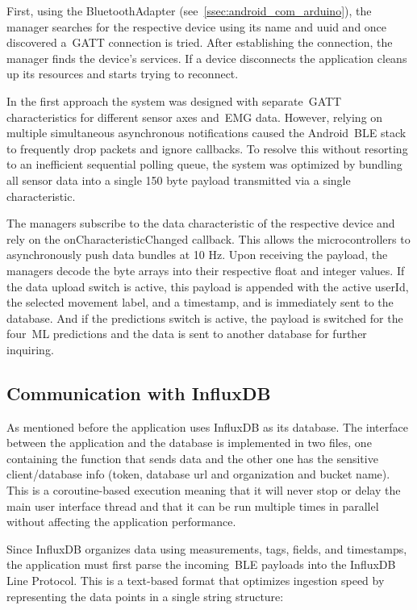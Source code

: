 First, using the BluetoothAdapter (see~\autoref{ssec:android_com_arduino}), the manager searches for the respective device using its name and uuid and once discovered a~\gls{GATT} connection is tried. After establishing the connection, 
the manager finds the device's services. If a device disconnects the application cleans up its resources and starts trying to reconnect.

In the first approach the system was designed with separate~\gls{GATT} characteristics for different sensor axes and~\gls{EMG} data. However, relying on multiple simultaneous asynchronous notifications caused the Android~\gls{BLE} stack to 
frequently drop packets and ignore callbacks. To resolve this without resorting to an inefficient sequential polling queue, the system was optimized by bundling all sensor data into a single 150 byte payload transmitted via a single 
characteristic.

The managers subscribe to the data characteristic of the respective device and rely on the onCharacteristicChanged callback. This allows the microcontrollers to asynchronously push data bundles at 10 Hz. Upon receiving the payload, the 
managers decode the byte arrays into their respective float and integer values. If the data upload switch is active, this payload is appended with the active userId, the selected movement label, and a timestamp, and is immediately sent 
to the database. And if the predictions switch is active, the payload is switched for the four~\gls{ML} predictions and the data is sent to another database for further inquiring.

\subsection{Communication with InfluxDB}
\label{ssec:android_com_data_base}

As mentioned before the application uses InfluxDB as its database. The interface between the application and the database is implemented in two files, one containing the function that sends data and the other one has the sensitive 
client/database info (token, database url and organization and bucket name). This is a coroutine-based execution meaning that it will never stop or delay the main user interface thread and that it can be run multiple times in parallel 
without affecting the application performance.

Since InfluxDB organizes data using measurements, tags, fields, and timestamps, the application must first parse the incoming~\gls{BLE} payloads into the InfluxDB Line Protocol. This is a text-based format that optimizes ingestion 
speed by representing the data points in a single string structure:

